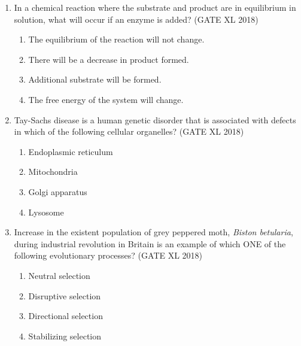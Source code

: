 \documentclass[14pt]{extarticle}
\begin{document}
\begin{flushleft}
\begin{enumerate}
    \item In a chemical reaction where the substrate and product are in equilibrium in solution, what will occur if an enzyme is added? \hfill(GATE XL 2018)\\
    \begin{enumerate}
        \item The equilibrium of the reaction will not change.
        \item There will be a decrease in product formed.
        \item Additional substrate will be formed.
        \item The free energy of the system will change.
    \end{enumerate}

    \item Tay-Sachs disease is a human genetic disorder that is associated with defects in which  of the following cellular organelles? 
    \hfill(GATE XL 2018)\\
    \begin{multicols}{2}
    \begin{enumerate}
        \item Endoplasmic reticulum
        \item Mitochondria
        \item Golgi apparatus
        \item Lysosome
    \end{enumerate}
    \end{multicols}

    \item Increase in the existent population of grey peppered moth, \textit{Biston betularia}, during industrial revolution in Britain is an example of which ONE of the following evolutionary processes? \hfill(GATE XL 2018)\\
    \begin{multicols}{2}
    \begin{enumerate}
        \item Neutral selection
        \item Disruptive selection
        \item Directional selection
        \item Stabilizing selection
    \end{enumerate}
    \end{multicols}
    


\end{enumerate}
\end{flushleft}
\end{document}
